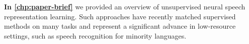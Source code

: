 
\vspace{3em}
\textbf{In \cref{chp:paper-brief}} we provided an overview of unsupervised neural speech representation learning. Such approaches have recently matched supervised methods on many tasks and represent a significant advance in low-resource settings, such as speech recognition for minority languages. 






